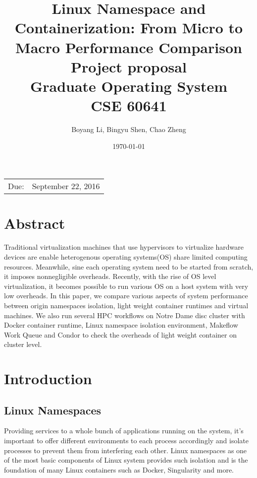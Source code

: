 \documentclass{article}
\title{{\textbf{Linux Namespace and Containerization: From Micro to Macro Performance Comparison}} \\
       \vspace{3\baselineskip}
       {\large Project proposal} \\
       \vspace{3\baselineskip}
       {\large Graduate Operating System} \\ 
       {\large CSE 60641} %
      }
\date{\today} %
\author{Boyang Li, Bingyu Shen, Chao Zheng}
\begin{document}
\maketitle %

\begin{center}
\begin{tabular}{l r}
Due:& September 22, 2016\\ 
\end{tabular}
\end{center}
\nocite{*}

\pagebreak

\section{Abstract}

Traditional virtualization machines that use hypervisors to virtualize hardware devices are 
enable heterogenous operating systems(OS) share limited computing resources. Meanwhile, sine each 
operating system need to be started from scratch, it imposes nonnegligible overheads. Recently, 
with the rise of OS level virtualization, it becomes possible to run various OS on a host system 
with very low overheads. In this paper, we compare various aspects of system performance between 
origin namespaces isolation, light weight container runtimes and virtual machines. We also run several
HPC workflows on Notre Dame disc cluster with Docker container runtime\cite{dockerwb}, Linux namespace
isolation environment, Makeflow\cite{albrecht2012makeflow} Work Queue\cite{bui2011work} and 
Condor\cite{thain2003condor} to check the overheads of light weight container on cluster level.  

\section{Introduction}

\subsection{Linux Namespaces}

Providing services to a whole bunch of applications running on the system, it's important to offer different environments to each process accordingly and isolate processes to prevent them from interfering each other. Linux namespaces as one of the most basic components of Linux system provides such isolation and is the foundation of many Linux containers such as Docker, Singularity and more.
\end{document}
